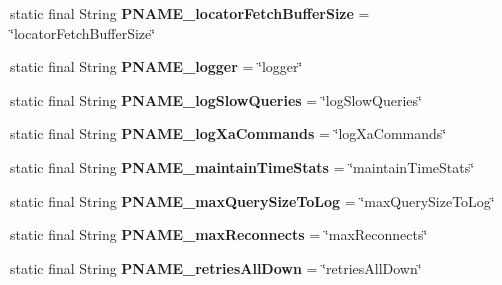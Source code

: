 \begin{DoxyCompactItemize}
static final String {\bfseries P\+N\+A\+M\+E\+\_\+locator\+Fetch\+Buffer\+Size} = \char`\"{}locator\+Fetch\+Buffer\+Size\char`\"{}
\item 
\mbox{\label{classcom_1_1mysql_1_1cj_1_1conf_1_1_property_definitions_a3b57c0f2812c5252f25fb8042c535413}} 
static final String {\bfseries P\+N\+A\+M\+E\+\_\+logger} = \char`\"{}logger\char`\"{}
\item 
\mbox{\label{classcom_1_1mysql_1_1cj_1_1conf_1_1_property_definitions_aea5be22aa8a1f548f8361584398f2b5a}} 
static final String {\bfseries P\+N\+A\+M\+E\+\_\+log\+Slow\+Queries} = \char`\"{}log\+Slow\+Queries\char`\"{}
\item 
\mbox{\label{classcom_1_1mysql_1_1cj_1_1conf_1_1_property_definitions_af3e0561482b8535ac5aff259de82ac11}} 
static final String {\bfseries P\+N\+A\+M\+E\+\_\+log\+Xa\+Commands} = \char`\"{}log\+Xa\+Commands\char`\"{}
\item 
\mbox{\label{classcom_1_1mysql_1_1cj_1_1conf_1_1_property_definitions_a9df90ceb57d1d91292bf61563f5f2a4d}} 
static final String {\bfseries P\+N\+A\+M\+E\+\_\+maintain\+Time\+Stats} = \char`\"{}maintain\+Time\+Stats\char`\"{}
\item 
\mbox{\label{classcom_1_1mysql_1_1cj_1_1conf_1_1_property_definitions_a6cf16aac371a84bbe3f03a4ea83f2588}} 
static final String {\bfseries P\+N\+A\+M\+E\+\_\+max\+Query\+Size\+To\+Log} = \char`\"{}max\+Query\+Size\+To\+Log\char`\"{}
\item 
\mbox{\label{classcom_1_1mysql_1_1cj_1_1conf_1_1_property_definitions_a15c296a8cb68bd7c5c34c791182e312f}} 
static final String {\bfseries P\+N\+A\+M\+E\+\_\+max\+Reconnects} = \char`\"{}max\+Reconnects\char`\"{}
\item 
\mbox{\label{classcom_1_1mysql_1_1cj_1_1conf_1_1_property_definitions_a0b4a5a4a93b6ee5dc813d8303f598bd3}} 
static final String {\bfseries P\+N\+A\+M\+E\+\_\+retries\+All\+Down} = \char`\"{}retries\+All\+Down\char`\"{}

\end{DoxyCompactItemize}
